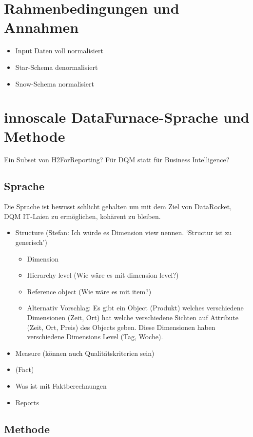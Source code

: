 \documentclass[
  language=german, %
  type=bachelor%
]{isthesis}
\begin{document}
\begin{content}
  \section{Rahmenbedingungen und Annahmen}
  \begin{itemize}
    \item Input Daten voll normalisiert
    \item Star-Schema denormalisiert
    \item Snow-Schema normalisiert
  \end{itemize}

  \section{innoscale DataFurnace-Sprache und Methode}
  Ein Subset von H2ForReporting?
  Für DQM statt für Business Intelligence?

  \subsection{Sprache}
  Die Sprache ist bewusst schlicht gehalten um mit dem Ziel von DataRocket, DQM
  IT-Laien zu ermöglichen, kohärent zu bleiben.
  \begin{itemize}
    \item Structure (Stefan: Ich würde es Dimension view nennen. `Structur ist zu generisch')
      \begin{itemize}
        \item Dimension
        \item Hierarchy level (Wie wäre es mit dimension level?)
        \item Reference object (Wie wäre es mit item?)
        \item Alternativ Vorschlag: Es gibt ein Object (Produkt) welches verschiedene Dimensionen
          (Zeit, Ort) hat welche verschiedene Sichten auf Attribute (Zeit, Ort,
          Preis) des Objects geben. Diese Dimensionen haben verschiedene
          Dimensions Level (Tag, Woche).
      \end{itemize}
    \item Measure (können auch Qualitätskriterien sein)
    \item (Fact)
    \item Was ist mit Faktberechnungen
    \item Reports
  \end{itemize}

  \subsection{Methode}



\end{content}
\end{document}
